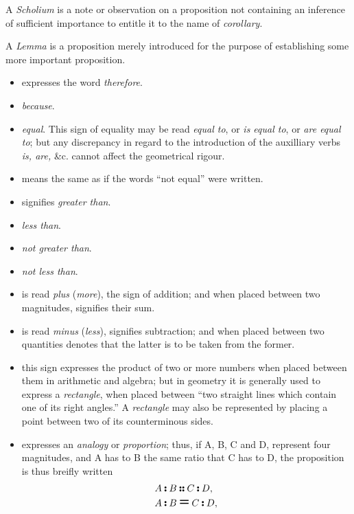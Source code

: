 A \textit{Scholium} is a note or observation on a proposition not containing an inference of sufficient importance to entitle it to the name of \textit{corollary}. 

A \textit{Lemma} is a proposition merely introduced for the purpose of establishing some more important proposition. 

\begin{itemize}
\item[\therefore] expresses the word \textit{therefore}.
\item[\because]  \textit{because}.
\item[\equals]  \textit{equal}. This sign of equality may be read \textit{equal to}, or \textit{is equal to}, or \textit{are equal to}; but any discrepancy in regard to the introduction of the auxilliary verbs \textit{is, are, }\&c. cannot affect the geometrical rigour. 
\item[\notequals] means the same as if the words ``not equal'' were written.\item[\greater] signifies \textit{greater than}.
\item[\less]  \textit{less than}.
\item[\notgreater] \textit{not greater than}.
\item[\notless] \textit{not less than}. 
\item[\plus] is read \textit{plus} (\textit{more}), the sign of addition; and when placed between two magnitudes, signifies their sum. 
\item[\minus] is read \textit{minus} (\textit{less}), signifies subtraction; and when placed between two quantities denotes that the latter is to be taken from the former. 
\item[\cross] this sign expresses the product of two or more numbers when placed between them in arithmetic and algebra; but in geometry it is generally used to express a \textit{rectangle}, when placed between ``two straight lines which contain one of its right angles.'' A \textit{rectangle} may also be represented by placing a point between two of its counterminous sides. 
\item[\isto \as \isto] expresses an \textit{analogy} or \textit{proportion}; thus, if A, B, C and D, represent four magnitudes, and A has to B the same ratio that C has to D, the proposition is thus breifly written 
\begin{align*}
A \isto B &\as C \isto D,\\
A \isto B &\equals C \isto D,\\

\end{align*}
\end{itemize}
